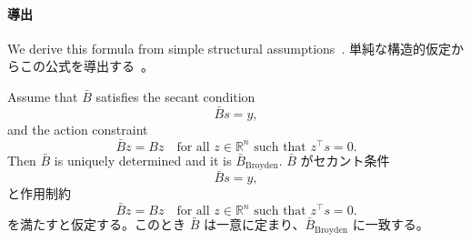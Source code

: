 \documentclass[0_main]{subfiles}
\begin{document}
    \paragraph{導出}
\fi

\ifEn
    We derive this formula from simple structural assumptions~\citep[Section 4]{dennisjr.QuasiNewtonMethodsMotivation1977a}.
\else
    単純な構造的仮定からこの公式を導出する~\citep[Section 4]{dennisjr.QuasiNewtonMethodsMotivation1977a}。
\fi
\begin{proposition}
    \ifEn
        Assume that $\bar{B}$ satisfies the secant condition
        \begin{equation*}
            \bar{B}s = y,
        \end{equation*}
        and the action constraint
        \begin{equation*}
            \bar{B}z = Bz
            \quad\text{for all } z\in\mathbb{R}^n \text{ such that } z^\top s = 0.
        \end{equation*}
        Then $\bar{B}$ is uniquely determined and it is $\bar{B}_{\mathrm{Broyden}}$.
    \else
        $\bar{B}$ がセカント条件
        \begin{equation*}
            \bar{B}s = y,
        \end{equation*}
        と作用制約
        \begin{equation*}
            \bar{B}z = Bz
            \quad\text{for all } z\in\mathbb{R}^n \text{ such that } z^\top s = 0.
        \end{equation*}
        を満たすと仮定する。このとき $\bar{B}$ は一意に定まり、$\bar{B}_{\mathrm{Broyden}}$ に一致する。
    \fi
\end{proposition}
\end{document}
